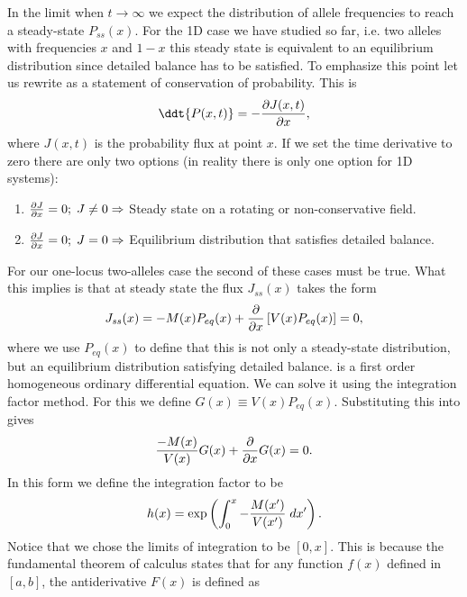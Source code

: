 In the limit when $t \rightarrow \infty$ we expect the distribution of allele
frequencies to reach a steady-state $P_{ss}(x)$. For the 1D case we have
studied so far, i.e. two alleles with frequencies $x$ and $1 - x$ this steady
state is equivalent to an equilibrium distribution since detailed balance has
to be satisfied. To emphasize this point let us rewrite
 as a statement of conservation of probability. This
is
\begin{equation}
  \ddt{P(x, t)} = - {\partial J(x, t) \over \partial x},
\end{equation}
where $J(x, t)$ is the probability flux at point $x$. If we set the time
derivative to zero there are only two options (in reality there is only one
option for 1D systems):
\begin{enumerate}
  \item ${\partial J \over \partial x} = 0; \; J \neq 0 \Rightarrow$ Steady
  state on a rotating or non-conservative field.
  \item ${\partial J \over \partial x} = 0; \; J = 0 \Rightarrow$ Equilibrium
  distribution that satisfies detailed balance.
\end{enumerate}
For our one-locus two-alleles case the second of these cases must be true.
What this implies is that at steady state the flux $J_{ss}(x)$ takes the form
\begin{equation}
  J_{ss}(x) = - M(x) P_{eq}(x) + {\partial \over \partial x}
  \left[ V(x) P_{eq}(x) \right] = 0,
  \label{eq_flux_eq}
\end{equation}
where we use $P_{eq}(x)$ to define that this is not only a steady-state
distribution, but an equilibrium distribution satisfying detailed balance.
 is a first order homogeneous ordinary differential equation.
We can solve it using the integration factor method. For this we define
$G(x) \equiv V(x)P_{eq}(x)$. Substituting this into  gives
\begin{equation}
  {- M(x) \over V(x)} G(x) + {\partial \over \partial x} G(x) = 0.
  \label{eq_ode_ss}
\end{equation}
In this form we define the integration factor to be
\begin{equation}
  h(x) = \exp \left( \int_0^x -{M(x') \over V(x')} \; dx' \right).
\end{equation}
Notice that we chose the limits of integration to be $[0, x]$. This is because
the fundamental theorem of calculus states that for any function $f(x)$ defined
in $[a, b]$, the antiderivative $F(x)$ is defined as
